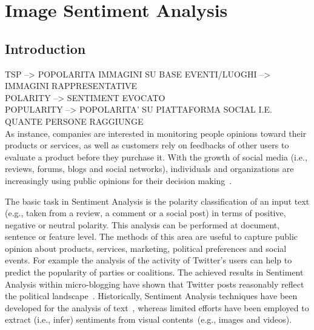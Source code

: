 \chapter{Image Sentiment Analysis}\label{ch3}
\section{Introduction}
TSP --> POPOLARITA IMMAGINI SU BASE EVENTI/LUOGHI --> IMMAGINI RAPPRESENTATIVE
\\POLARITY --> SENTIMENT EVOCATO
\\POPULARITY --> POPOLARITA' SU PIATTAFORMA SOCIAL I.E. QUANTE PERSONE RAGGIUNGE\\
As instance, companies are interested in monitoring people opinions toward their products or services, as well as customers rely on feedbacks of other users to evaluate a product before they purchase it.
With the growth of social media (i.e., reviews, forums, blogs and social networks), individuals and organizations are increasingly using public opinions  for their decision making~\cite{liu2012survey}.


The basic task in Sentiment Analysis is the polarity classification of an input text (e.g., taken from a review, a comment or a social post) in terms of positive, negative or neutral polarity. This analysis can be performed at document, sentence or feature level. The methods of this area are useful to capture public opinion about products, services, marketing, political preferences and social events. For example the analysis of the activity of Twitter's users can help to predict the popularity of parties or coalitions. The achieved results in Sentiment Analysis within micro-blogging have shown that Twitter posts reasonably reflect the political landscape~\cite{tumasjan2010predicting}.
Historically, Sentiment Analysis techniques have been developed for the analysis of text~\cite{pang2008opinion}, whereas limited efforts have been employed to extract (i.e., infer) sentiments from visual contents~(e.g., images and videos). %

